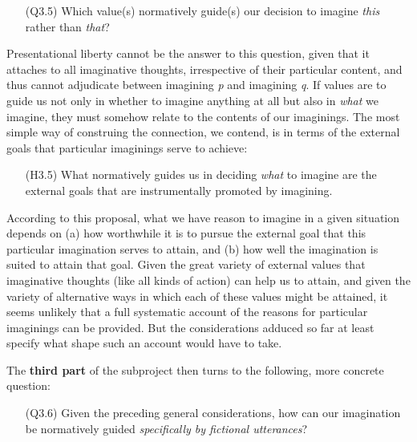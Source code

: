 \vspace{-.1cm}
\begin{itemize}[leftmargin=2cm]
\item[(Q3.5)] Which value(s) normatively guide(s) our decision to imagine \emph{this} rather than \emph{that}?
\end{itemize}
\vspace{-.1cm}

\noindent Presentational liberty cannot be the answer to this question, given that it attaches to all imaginative thoughts, irrespective of their particular content, and thus cannot adjudicate between imagining \emph{p} and imagining \emph{q}. If values are to guide us not only in whether to imagine anything at all but also in \emph{what} we imagine, they must somehow relate to the contents of our imaginings. The most simple way of construing the connection, we contend, is in terms of the external goals that particular imaginings serve to achieve:

\vspace{-.1cm}
\begin{itemize}[leftmargin=2cm]
\item[(H3.5)] What normatively guides us in deciding \emph{what} to imagine are the external goals that are instrumentally promoted by imagining.
\end{itemize}
\vspace{-.1cm}

\noindent According to this proposal, what we have reason to imagine in a given situation depends on (a) how worthwhile it is to pursue the external goal that this particular imagination serves to attain, and (b) how well the imagination is suited to attain that goal. Given the great variety of external values that imaginative thoughts (like all kinds of action) can help us to attain, and given the variety of alternative ways in which each of these values might be attained, it seems unlikely that a full systematic account of the reasons for particular imaginings can be provided. But the considerations adduced so far at least specify what shape such an account would have to take.

The \textbf{third part} of the subproject then turns to the following, more concrete question:

\vspace{-.1cm}
\begin{itemize}[leftmargin=2cm]
\item[(Q3.6)] Given the preceding general considerations, how can our imagination be normatively guided \emph{specifically by fictional utterances}?
\end{itemize}
\vspace{-.1cm}
 
